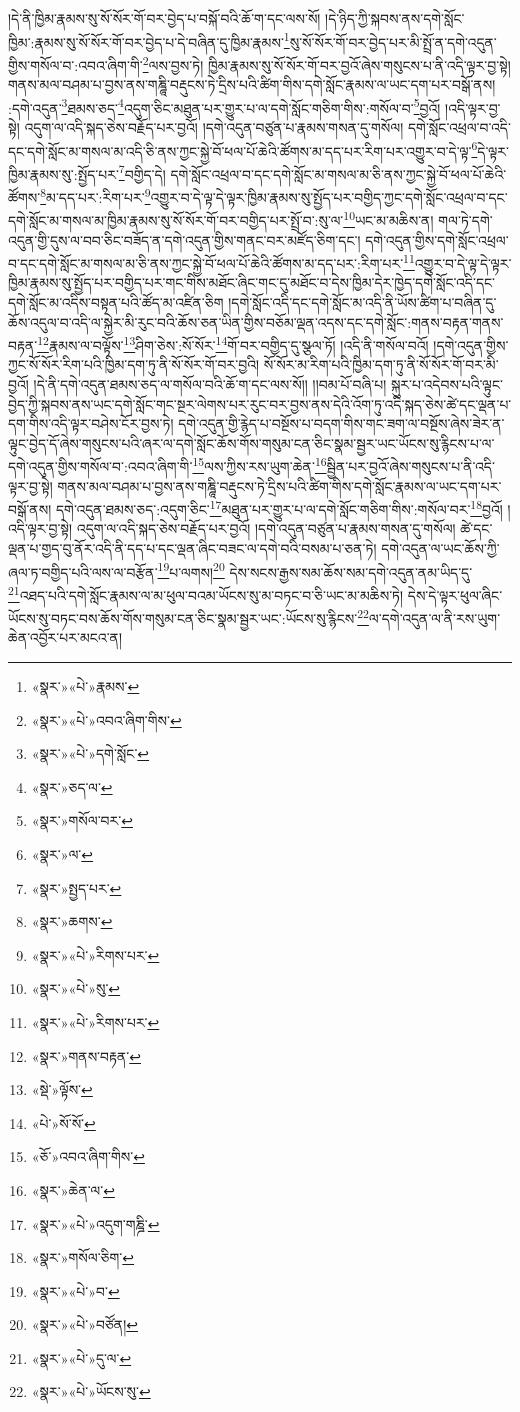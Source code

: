 །དེ་ནི་ཁྱིམ་རྣམས་སུ་སོ་སོར་གོ་བར་བྱེད་པ་བསྐོ་བའི་ཆོ་ག་དང་ལས་སོ། །དེ་ཉིད་ཀྱི་སྐབས་ནས་དགེ་སློང་ཁྱིམ་:རྣམས་སུ་སོ་སོར་གོ་བར་བྱེད་པ་དེ་བཞིན་དུ་ཁྱིམ་རྣམས་\footnote{«སྣར་»«པེ་»རྣམས་}སུ་སོ་སོར་གོ་བར་བྱེད་པར་མི་སྤྲོ་ན་དགེ་འདུན་གྱིས་གསོལ་བ་:འབའ་ཞིག་གི་\footnote{«སྣར་»«པེ་»འབའ་ཞིག་གིས་}ལས་བྱས་ཏེ། ཁྱིམ་རྣམས་སུ་སོ་སོར་གོ་བར་བྱའོ་ཞེས་གསུངས་པ་ནི་འདི་ལྟར་བྱ་སྟེ། གནས་མལ་བཤམ་པ་བྱས་ནས་གཎྜཱི་བརྡུངས་ཏེ་དྲིས་པའི་ཚིག་གིས་དགེ་སློང་རྣམས་ལ་ཡང་དག་པར་བསྒོ་ནས། :དགེ་འདུན་\footnote{«སྣར་»«པེ་»དགེ་སློང་}ཐམས་ཅད་\footnote{«སྣར་»ཅད་ལ་}འདུག་ཅིང་མཐུན་པར་གྱུར་པ་ལ་དགེ་སློང་གཅིག་གིས་:གསོལ་བ་\footnote{«སྣར་»གསོལ་བར་}བྱའོ། །འདི་ལྟར་བྱ་སྟེ། འདུག་ལ་འདི་སྐད་ཅེས་བརྗོད་པར་བྱའོ། །དགེ་འདུན་བཙུན་པ་རྣམས་གསན་དུ་གསོལ། དགེ་སློང་འཕྲལ་བ་འདི་དང་དགེ་སློང་མ་གསལ་མ་འདི་ཅི་ནས་ཀྱང་སྐྱེ་བོ་ཕལ་པོ་ཆེའི་ཚོགས་མ་དད་པར་རིག་པར་འགྱུར་བ་དེ་ལྟ་\footnote{«སྣར་»ལ་}དེ་ལྟར་ཁྱིམ་རྣམས་སུ་:སྤྱོད་པར་\footnote{«སྣར་»སྤྱད་པར་}བགྱིད་དེ། དགེ་སློང་འཕྲལ་བ་དང་དགེ་སློང་མ་གསལ་མ་ཅི་ནས་ཀྱང་སྐྱེ་བོ་ཕལ་པོ་ཆེའི་ཚོགས་\footnote{«སྣར་»ཆགས་}མ་དད་པར་:རིག་པར་\footnote{«སྣར་»«པེ་»རིགས་པར་}འགྱུར་བ་དེ་ལྟ་དེ་ལྟར་ཁྱིམ་རྣམས་སུ་སྤྱོད་པར་བགྱིད་ཀྱང་དགེ་སློང་འཕྲལ་བ་དང་དགེ་སློང་མ་གསལ་མ་ཁྱིམ་རྣམས་སུ་སོ་སོར་གོ་བར་བགྱིད་པར་སྤྲོ་བ་:སུ་ལ་\footnote{«སྣར་»«པེ་»སུ་}ཡང་མ་མཆིས་ན། གལ་ཏེ་དགེ་འདུན་གྱི་དུས་ལ་བབ་ཅིང་བཟོད་ན་དགེ་འདུན་གྱིས་གནང་བར་མཛོད་ཅིག་དང་། དགེ་འདུན་གྱིས་དགེ་སློང་འཕྲལ་བ་དང་དགེ་སློང་མ་གསལ་མ་ཅི་ནས་ཀྱང་སྐྱེ་བོ་ཕལ་པོ་ཆེའི་ཚོགས་མ་དད་པར་:རིག་པར་\footnote{«སྣར་»«པེ་»རིགས་པར་}འགྱུར་བ་དེ་ལྟ་དེ་ལྟར་ཁྱིམ་རྣམས་སུ་སྤྱོད་པར་བགྱིད་པར་གང་གིས་མཐོང་ཞིང་གང་དུ་མཐོང་བ་དེས་ཁྱིམ་དེར་ཁྱེད་དགེ་སློང་འདི་དང་དགེ་སློང་མ་འདིས་བསྟན་པའི་ཚོད་མ་འཛིན་ཅིག །དགེ་སློང་འདི་དང་དགེ་སློང་མ་འདི་ནི་ཡོས་ཚིག་པ་བཞིན་དུ་ཆོས་འདུལ་བ་འདི་ལ་སྐྱེར་མི་རུང་བའི་ཆོས་ཅན་ཡིན་གྱིས་བཅོམ་ལྡན་འདས་དང་དགེ་སློང་:གནས་བརྟན་གནས་བརྟན་\footnote{«སྣར་»གནས་བརྟན་}རྣམས་ལ་བལྟོས་\footnote{«སྡེ་»ལྟོས་}ཤིག་ཅེས་:སོ་སོར་\footnote{«པེ་»སོ་སོ་}གོ་བར་བགྱིད་དུ་སྩལ་ཏོ། །འདི་ནི་གསོལ་བའོ། །དགེ་འདུན་གྱིས་ཀྱང་སོ་སོར་རིག་པའི་ཁྱིམ་དག་ཏུ་ནི་སོ་སོར་གོ་བར་བྱའི། སོ་སོར་མ་རིག་པའི་ཁྱིམ་དག་ཏུ་ནི་སོ་སོར་གོ་བར་མི་བྱའོ། །དེ་ནི་དགེ་འདུན་ཐམས་ཅད་ལ་གསོལ་བའི་ཆོ་ག་དང་ལས་སོ།། །།བམ་པོ་བཞི་པ། སྐུར་པ་འདེབས་པའི་ལྟུང་བྱེད་ཀྱི་སྐབས་ནས་ཡང་དགེ་སློང་གང་སྔར་ལེགས་པར་རུང་བར་བྱས་ནས་དེའི་འོག་ཏུ་འདི་སྐད་ཅེས་ཚེ་དང་ལྡན་པ་དག་གིས་འདི་ལྟར་བཤེས་ངོར་བྱས་ཏེ། དགེ་འདུན་གྱི་རྙེད་པ་བསྔོས་པ་བདག་གིས་གང་ཟག་ལ་བསྔོས་ཞེས་ཟེར་ན་ལྟུང་བྱེད་དོ་ཞེས་གསུངས་པའི་ཞར་ལ་དགེ་སློང་ཆོས་གོས་གསུམ་ངན་ཅིང་སྣམ་སྦྱར་ཡང་ཡོངས་སུ་རྙིངས་པ་ལ་དགེ་འདུན་གྱིས་གསོལ་བ་:འབའ་ཞིག་གི་\footnote{«ཅོ་»འབའ་ཞིག་གིས་}ལས་ཀྱིས་རས་ཡུག་ཆེན་\footnote{«སྣར་»ཆེན་ལ་}སྦྱིན་པར་བྱའོ་ཞེས་གསུངས་པ་ནི་འདི་ལྟར་བྱ་སྟེ། གནས་མལ་བཤམ་པ་བྱས་ནས་གཎྜཱི་བརྡུངས་ཏེ་དྲིས་པའི་ཚིག་གིས་དགེ་སློང་རྣམས་ལ་ཡང་དག་པར་བསྒོ་ནས། དགེ་འདུན་ཐམས་ཅད་:འདུག་ཅིང་\footnote{«སྣར་»«པེ་»འདུག་གཎྜི་}མཐུན་པར་གྱུར་པ་ལ་དགེ་སློང་གཅིག་གིས་:གསོལ་བར་\footnote{«སྣར་»གསོལ་ཅིག་}བྱའོ། །འདི་ལྟར་བྱ་སྟེ། འདུག་ལ་འདི་སྐད་ཅེས་བརྗོད་པར་བྱའོ། །དགེ་འདུན་བཙུན་པ་རྣམས་གསན་དུ་གསོལ། ཚེ་དང་ལྡན་པ་གྱད་བུ་ནོར་འདི་ནི་དད་པ་དང་ལྡན་ཞིང་བཟང་ལ་དགེ་བའི་བསམ་པ་ཅན་ཏེ། དགེ་འདུན་ལ་ཡང་ཆོས་ཀྱི་ཞལ་ཏ་བགྱིད་པའི་ལས་ལ་བརྩོན་\footnote{«སྣར་»«པེ་»བ་}པ་ལགས།\footnote{«སྣར་»«པེ་»བཙོན།} དེས་སངས་རྒྱས་སམ་ཆོས་སམ་དགེ་འདུན་ནམ་ཡིད་དུ་\footnote{«སྣར་»«པེ་»དུ་ལ་}འཐད་པའི་དགེ་སློང་རྣམས་ལ་མ་ཕུལ་བའམ་ཡོངས་སུ་མ་བཏང་བ་ཅི་ཡང་མ་མཆིས་ཏེ། དེས་དེ་ལྟར་ཕུལ་ཞིང་ཡོངས་སུ་བཏང་བས་ཆོས་གོས་གསུམ་ངན་ཅིང་སྣམ་སྦྱར་ཡང་:ཡོངས་སུ་རྙིངས་\footnote{«སྣར་»«པེ་»ཡོངས་སུ་}ལ་དགེ་འདུན་ལ་ནི་རས་ཡུག་ཆེན་འབྱོར་པར་མངའ་ན། 